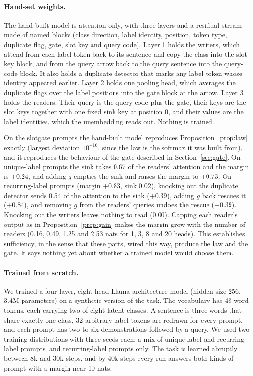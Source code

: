 \documentclass{article}
\begin{document}
\paragraph{Hand-set weights.} The hand-built model is attention-only, with three layers and a residual stream made of named blocks (class direction, label identity, position, token type, duplicate flag, gate, slot key and query code). Layer 1 holds the writers, which attend from each label token back to its sentence and copy the class into the slot-key block, and from the query arrow back to the query sentence into the query-code block. It also holds a duplicate detector that marks any label token whose identity appeared earlier. Layer 2 holds one pooling head, which averages the duplicate flags over the label positions into the gate block at the arrow. Layer 3 holds the readers. Their query is the query code plus the gate, their keys are the slot keys together with one fixed sink key at position 0, and their values are the label identities, which the unembedding reads out. Nothing is trained.

On the slotgate prompts the hand-built model reproduces Proposition~\ref{prop:law} exactly (largest deviation $10^{-16}$, since the law is the softmax it was built from), and it reproduces the behaviour of the gate described in Section~\ref{sec:gate}. On unique-label prompts the sink takes 0.67 of the readers' attention and the margin is $+0.24$, and adding $g$ empties the sink and raises the margin to $+0.73$. On recurring-label prompts (margin $+0.83$, sink 0.02), knocking out the duplicate detector sends 0.54 of the attention to the sink ($+0.39$), adding $g$ back rescues it ($+0.84$), and removing $g$ from the readers' queries undoes the rescue ($+0.39$). Knocking out the writers leaves nothing to read ($0.00$). Capping each reader's output as in Proposition~\ref{prop:gain} makes the margin grow with the number of readers (0.16, 0.49, 1.25 and 2.53 nats for 1, 3, 8 and 20 heads). This establishes sufficiency, in the sense that these parts, wired this way, produce the law and the gate. It says nothing yet about whether a trained model would choose them.

\paragraph{Trained from scratch.} We trained a four-layer, eight-head Llama-architecture model (hidden size 256, 3.4M parameters) on a synthetic version of the task. The vocabulary has 48 word tokens, each carrying two of eight latent classes. A sentence is three words that share exactly one class, 32 arbitrary label tokens are redrawn for every prompt, and each prompt has two to six demonstrations followed by a query. We used two training distributions with three seeds each: a mix of unique-label and recurring-label prompts, and recurring-label prompts only. The task is learned abruptly between 8k and 30k steps, and by 40k steps every run answers both kinds of prompt with a margin near 10 nats.
\end{document}
